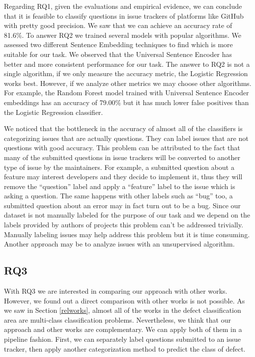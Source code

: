 \documentclass[conference]{IEEEtran}
\begin{document}
Regarding RQ1, given the evaluations and empirical evidence, we can conclude that it is feasible to classify 
questions in issue trackers of platforms like GitHub with pretty good precision. We saw that we can achieve 
an accuracy rate of 81.6\%. To answer RQ2 we trained several models with popular algorithms. We assessed two
different Sentence Embedding techniques to find which is more suitable for our task. We observed that the 
Universal Sentence Encoder has better and more consistent performance for our task. The answer to RQ2 is not a 
single algorithm, if we only measure the accuracy metric, the Logistic Regression works best. However, if we
analyze other metrics we may choose other algorithms. For example, the Random Forest model trained with
Universal Sentence Encoder embeddings has an accuracy of 79.00\% but it has much lower false positives than the 
Logistic Regression classifier.

We noticed that the bottleneck in the accuracy of almost all of the classifiers is categorizing issues that are 
actually questions. They can label issues that are not questions with good accuracy. This problem can be attributed 
to the fact that many of the submitted questions in issue trackers will be converted to another type of issue by 
the maintainers. For example, a submitted question about a feature may interest developers and they decide to 
implement it, thus they will remove the ``question'' label and apply a ``feature'' label to the issue which is 
asking a question. The same happens with other labels such as ``bug'' too, a submitted question about an error 
may in fact turn out to be a bug. Since our dataset is not manually labeled for the purpose of our task and we 
depend on the labels provided by authors of projects this problem can't be addressed trivially. 
Manually labeling issues may help address this problem but it is time consuming. Another approach may be to analyze 
issues with an unsupervised algorithm.

\subsection{RQ3}
With RQ3 we are interested in comparing our approach with other works. However, we found out 
a direct comparison with other works is not possible. As we saw in Section \ref{relworks}, almost 
all of the works in the defect classification area are multi-class classification problems. 
Nevertheless, we think that our approach and other works are complementary.
We can apply both of them in a pipeline fashion. First, we can separately label questions submitted to an 
issue tracker, then apply another categorization method to predict the class of defect.
\end{document}

